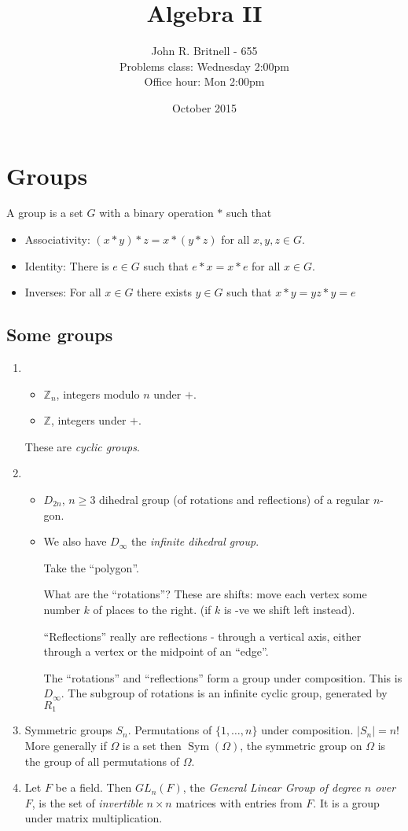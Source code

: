 \documentclass{article}
\title{Algebra II}
\author{John R. Britnell - 655\\
        Problems class: Wednesday 2:00pm\\
        Office hour: Mon 2:00pm}
\date{October 2015}
\theoremstyle{definition}
\DeclareMathOperator{\Sym}{Sym}
\begin{document}
\maketitle

\section{Groups}
A group is a set $G$ with a binary operation $*$ such that 
\begin{itemize}
\item Associativity: $(x * y)*z = x * (y * z)$ for all $x,y,z \in G$.
\item Identity: There is $e \in G$ such that $e * x = x * e$ for all $x \in G$.
\item Inverses: For all $x \in G$ there exists $y \in G$ such that $x * y = yz * y = e$
\end{itemize}

\subsection{Some groups}
\begin{enumerate}
\item
\begin{itemize}
\item $\mathbb{Z}_n$, integers modulo $n$ under $+$.
\item $\mathbb{Z}$, integers under $+$.
\end{itemize}
These are \emph{cyclic groups}.
\item
\begin{itemize}
\item $D_{2n}$, $n \geq 3$ dihedral group (of rotations and reflections) of a regular $n$-gon.
\item We also have $D_\infty$ the \emph{infinite dihedral group}.

Take the ``polygon''.

What are the ``rotations''? These are shifts: move each vertex some number $k$ of places to the right. (if $k$ is -ve we shift left instead). 

``Reflections'' really are reflections - through a vertical axis, either through a vertex or the midpoint of an ``edge''.

The ``rotations'' and ``reflections'' form a group under composition. This is $D_\infty$. The subgroup of rotations is an infinite cyclic group, generated by $R_1$

\end{itemize}
\item Symmetric groups $S_n$. Permutations of $\{1, \ldots, n\}$ under composition. $|S_n| = n!$
More generally if $\Omega$ is a set then $\Sym(\Omega)$, the symmetric group on $\Omega$ is the group of all permutations of $\Omega$.

\item Let $F$ be a field. Then $GL_n(F)$, the \emph{General Linear Group of degree $n$ over $F$}, is the set of \emph{invertible} $n \times n$ matrices with entries from $F$. It is a group under matrix multiplication. 
\end{enumerate}
\end{document}
